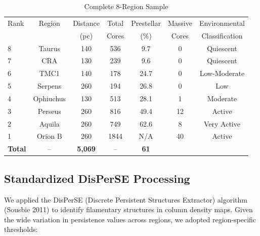 \documentclass[11pt,a4paper]{article}
\begin{document}
\begin{table}[H]
\centering
\caption{Complete 8-Region Sample}
\begin{tabular}{lcccccc}
\toprule
Rank & Region & Distance & Total & Prestellar & Massive & Environmental \\
     &        & (pc)   & Cores & (\%)    & Cores & Classification \\
\midrule
8 & Taurus   & 140     & 536   & 9.7   & 0      & Quiescent \\
7 & CRA      & 130     & 239   & 9.6   & 0      & Quiescent \\
6 & TMC1     & 140     & 178   & 24.7  & 0      & Low-Moderate \\
5 & Serpens  & 260     & 194   & 26.8  & 0      & Low \\
4 & Ophiuchus& 130     & 513   & 28.1  & 1      & Moderate \\
3 & Perseus  & 260     & 816   & 49.4  & 12     & Active \\
2 & Aquila   & 260     & 749   & 62.6  & 8      & Very Active \\
1 & Orion B  & 260     & 1844  & N/A   & 40     & Active \\
\midrule
\textbf{Total} & --      & \textbf{5,069} & --    & \textbf{61} & \\
\bottomrule
\end{tabular}
\end{table}

\subsection{Standardized DisPerSE Processing}

We applied the DisPerSE (Discrete Persistent Structures Extractor) algorithm (Sousbie 2011) to identify filamentary structures in column density maps. Given the wide variation in persistence values across regions, we adopted region-specific thresholds:
\end{document}
